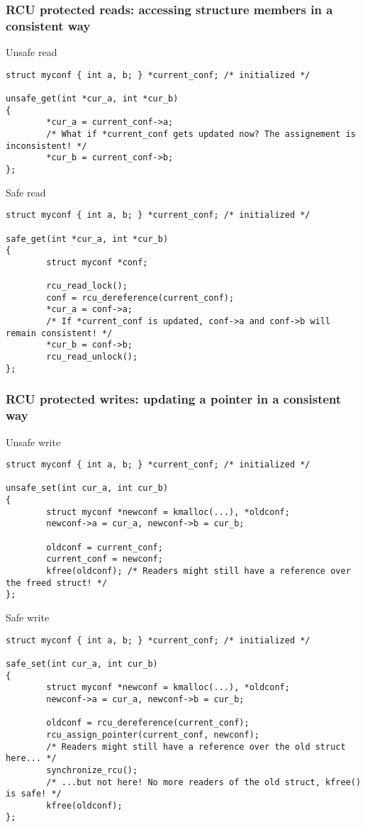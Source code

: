 \begin{frame}[fragile]
  \frametitle{RCU protected reads: accessing structure members in a consistent way}
    \begin{block}{Unsafe read}
      \begin{verbatim}
struct myconf { int a, b; } *current_conf; /* initialized */

unsafe_get(int *cur_a, int *cur_b)
{
        *cur_a = current_conf->a;
        /* What if *current_conf gets updated now? The assignement is inconsistent! */
        *cur_b = current_conf->b;
};
      \end{verbatim}
    \end{block}
  \begin{block}{Safe read}
    \begin{verbatim}
struct myconf { int a, b; } *current_conf; /* initialized */

safe_get(int *cur_a, int *cur_b)
{
        struct myconf *conf;

        rcu_read_lock();
        conf = rcu_dereference(current_conf);
        *cur_a = conf->a;
        /* If *current_conf is updated, conf->a and conf->b will remain consistent! */
        *cur_b = conf->b;
        rcu_read_unlock();
};
    \end{verbatim}
  \end{block}
\end{frame}

\begin{frame}[fragile]
  \frametitle{RCU protected writes: updating a pointer in a consistent way}
  \begin{block}{Unsafe write}
    \begin{verbatim}
struct myconf { int a, b; } *current_conf; /* initialized */

unsafe_set(int cur_a, int cur_b)
{
        struct myconf *newconf = kmalloc(...), *oldconf;
        newconf->a = cur_a, newconf->b = cur_b;

        oldconf = current_conf;
        current_conf = newconf;
        kfree(oldconf); /* Readers might still have a reference over the freed struct! */
};
    \end{verbatim}
  \end{block}
  \begin{block}{Safe write}
    \begin{verbatim}
struct myconf { int a, b; } *current_conf; /* initialized */

safe_set(int cur_a, int cur_b)
{
        struct myconf *newconf = kmalloc(...), *oldconf;
        newconf->a = cur_a, newconf->b = cur_b;

        oldconf = rcu_dereference(current_conf);
        rcu_assign_pointer(current_conf, newconf);
        /* Readers might still have a reference over the old struct here... */
        synchronize_rcu();
        /* ...but not here! No more readers of the old struct, kfree() is safe! */
        kfree(oldconf);
};
    \end{verbatim}
  \end{block}
\end{frame}

